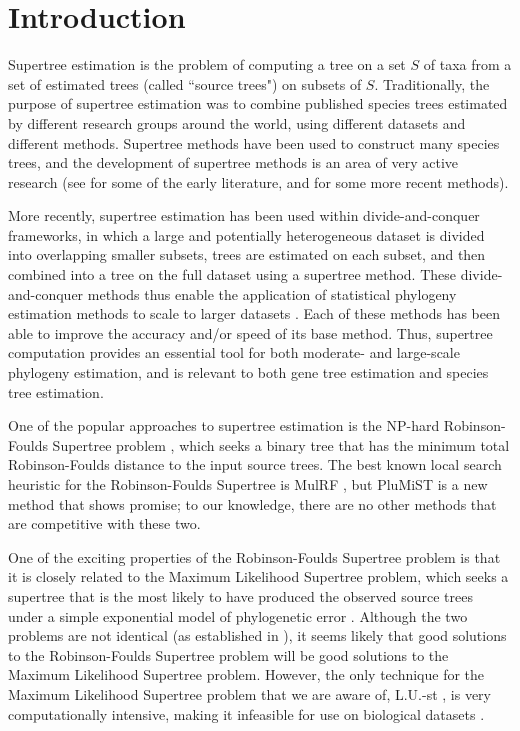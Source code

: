 
\section{Introduction}

Supertree estimation is the problem of computing a tree on a set $S$ of taxa from a set of estimated  trees (called ``source trees") on subsets of $S$. 
Traditionally, the purpose of supertree estimation was 
to combine published species trees estimated by different research groups around the world, using different datasets and different methods. 
Supertree methods have been used
to construct many species trees,
and the development of supertree methods is an area 
of very active research
(see 
\cite{bininda2004phylogenetic} for some of the early literature,
and \cite{mrl,superfine,Akanni-MLsupertree} for some more recent methods).

More recently, supertree estimation has been used within divide-and-conquer frameworks, in which a large and potentially heterogeneous dataset is divided into overlapping smaller subsets, trees are estimated on each subset, and then combined into a tree on the full dataset using a supertree method. 
These divide-and-conquer methods thus enable the application of  statistical phylogeny estimation methods to scale to larger datasets
\cite{DACTAL,BayzidRECOMBCG2014,afc,dcm1-huson}.
Each of these methods has been able to improve the accuracy and/or speed of its base method.  
Thus, supertree computation provides an essential tool for both moderate- and large-scale phylogeny estimation, and is relevant to both gene tree estimation and species tree estimation. 

One of the popular approaches to supertree estimation is the
NP-hard
Robinson-Foulds Supertree problem \cite{bansal2010robinson}, which 
seeks a binary tree that has the minimum total Robinson-Foulds
\cite{RF} distance to the input source trees.
The best known local search 
heuristic for the Robinson-Foulds Supertree
is MulRF \cite{mulrf}, but
PluMiST \cite{plumist} is a new method that
shows promise; 
to our knowledge, there are no
other methods that are competitive with these two.

One of the exciting properties of the
Robinson-Foulds Supertree problem is that it is closely
related to  the Maximum Likelihood Supertree problem,
which seeks a supertree that is the most likely to
have produced the observed source trees under a simple
exponential
model of phylogenetic error \cite{ml-supertree}.
Although the two problems are not identical
(as established in \cite{BryantSteel2009}),
it seems likely that 
good solutions to the
Robinson-Foulds Supertree problem will 
be good solutions to the Maximum 
Likelihood Supertree problem. 
However, 
the only technique for
the Maximum Likelihood Supertree problem that we are
aware of,  L.U.-st \cite{Akanni-MLsupertree},
is very computationally intensive, making it
infeasible for use
on biological datasets \cite{Akanni-Bayesian}.


